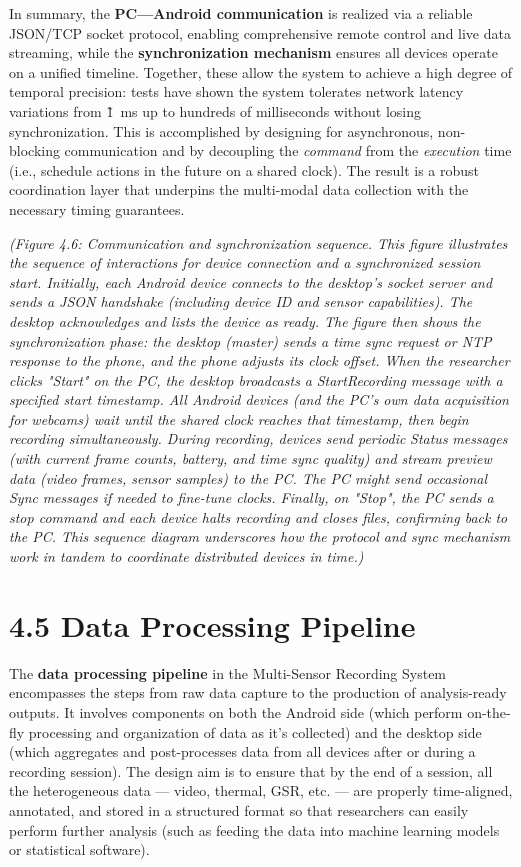 \documentclass[11pt,a4paper]{report}
\begin{document}
In summary, the \textbf{PC---Android communication} is realized via a reliable
JSON/TCP socket protocol, enabling comprehensive remote control and live
data streaming, while the \textbf{synchronization mechanism} ensures all
devices operate on a unified timeline. Together, these allow the system
to achieve a high degree of temporal precision: tests have shown the
system tolerates network latency variations from \~1 ms up to hundreds
of milliseconds without losing
synchronization.
This is accomplished by designing for asynchronous, non-blocking
communication and by decoupling the \textit{command} from the \textit{execution} time
(i.e., schedule actions in the future on a shared clock). The result is
a robust coordination layer that underpins the multi-modal data
collection with the necessary timing guarantees.

\textit{(Figure 4.6: Communication and synchronization sequence. This figure
illustrates the sequence of interactions for device connection and a
synchronized session start. Initially, each Android device connects to
the desktop's socket server and sends a JSON handshake (including device
ID and sensor capabilities). The desktop acknowledges and lists the
device as ready. The figure then shows the} \textit{synchronization phase: the
desktop (master) sends a time sync request or NTP response to the phone,
and the phone adjusts its clock offset. When the researcher clicks
"Start" on the PC, the desktop broadcasts a} \textit{StartRecording} \textit{message
with a specified start timestamp. All Android devices (and the PC's own
data acquisition for webcams) wait until the shared clock reaches that
timestamp, then begin recording simultaneously. During recording,
devices send periodic} \textit{Status} \textit{messages (with current frame counts,
battery, and time sync quality) and stream preview data (video frames,
sensor samples) to the PC. The PC might send occasional} \textit{Sync}
\textit{messages if needed to fine-tune clocks. Finally, on "Stop", the PC
sends a stop command and each device halts recording and closes files,
confirming back to the PC. This sequence diagram underscores how the
protocol and sync mechanism work in tandem to coordinate distributed
devices in time.)}

\section{4.5 Data Processing Pipeline}

The \textbf{data processing pipeline} in the Multi-Sensor Recording System
encompasses the steps from raw data capture to the production of
analysis-ready outputs. It involves components on both the Android side
(which perform on-the-fly processing and organization of data as it's
collected) and the desktop side (which aggregates and post-processes
data from all devices after or during a recording session). The design
aim is to ensure that by the end of a session, all the heterogeneous
data --- video, thermal, GSR, etc. --- are properly time-aligned,
annotated, and stored in a structured format so that researchers can
easily perform further analysis (such as feeding the data into machine
learning models or statistical software).
\end{document}
